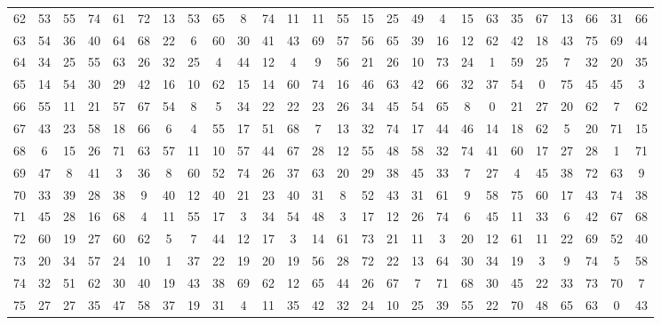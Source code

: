 \begin{table}
\begin{tabular}{c c c c c c c c c c c c c c c c c c c c c c c c c c }
62 & 53 & 55 & 74 & 61 & 72 & 13 & 53 & 65 & 8 & 74 & 11 & 11 & 55 & 15 & 25 & 49 & 4 & 15 & 63 & 35 & 67 & 13 & 66 & 31 & 66 \\
63 & 54 & 36 & 40 & 64 & 68 & 22 & 6 & 60 & 30 & 41 & 43 & 69 & 57 & 56 & 65 & 39 & 16 & 12 & 62 & 42 & 18 & 43 & 75 & 69 & 44 \\
64 & 34 & 25 & 55 & 63 & 26 & 32 & 25 & 4 & 44 & 12 & 4 & 9 & 56 & 21 & 26 & 10 & 73 & 24 & 1 & 59 & 25 & 7 & 32 & 20 & 35 \\
65 & 14 & 54 & 30 & 29 & 42 & 16 & 10 & 62 & 15 & 14 & 60 & 74 & 16 & 46 & 63 & 42 & 66 & 32 & 37 & 54 & 0 & 75 & 45 & 45 & 3 \\
66 & 55 & 11 & 21 & 57 & 67 & 54 & 8 & 5 & 34 & 22 & 22 & 23 & 26 & 34 & 45 & 54 & 65 & 8 & 0 & 21 & 27 & 20 & 62 & 7 & 62 \\
67 & 43 & 23 & 58 & 18 & 66 & 6 & 4 & 55 & 17 & 51 & 68 & 7 & 13 & 32 & 74 & 17 & 44 & 46 & 14 & 18 & 62 & 5 & 20 & 71 & 15 \\
68 & 6 & 15 & 26 & 71 & 63 & 57 & 11 & 10 & 57 & 44 & 67 & 28 & 12 & 55 & 48 & 58 & 32 & 74 & 41 & 60 & 17 & 27 & 28 & 1 & 71 \\
69 & 47 & 8 & 41 & 3 & 36 & 8 & 60 & 52 & 74 & 26 & 37 & 63 & 20 & 29 & 38 & 45 & 33 & 7 & 27 & 4 & 45 & 38 & 72 & 63 & 9 \\
70 & 33 & 39 & 28 & 38 & 9 & 40 & 12 & 40 & 21 & 23 & 40 & 31 & 8 & 52 & 43 & 31 & 61 & 9 & 58 & 75 & 60 & 17 & 43 & 74 & 38 \\
71 & 45 & 28 & 16 & 68 & 4 & 11 & 55 & 17 & 3 & 34 & 54 & 48 & 3 & 17 & 12 & 26 & 74 & 6 & 45 & 11 & 33 & 6 & 42 & 67 & 68 \\
72 & 60 & 19 & 27 & 60 & 62 & 5 & 7 & 44 & 12 & 17 & 3 & 14 & 61 & 73 & 21 & 11 & 3 & 20 & 12 & 61 & 11 & 22 & 69 & 52 & 40 \\
73 & 20 & 34 & 57 & 24 & 10 & 1 & 37 & 22 & 19 & 20 & 19 & 56 & 28 & 72 & 22 & 13 & 64 & 30 & 34 & 19 & 3 & 9 & 74 & 5 & 58 \\
74 & 32 & 51 & 62 & 30 & 40 & 19 & 43 & 38 & 69 & 62 & 12 & 65 & 44 & 26 & 67 & 7 & 71 & 68 & 30 & 45 & 22 & 33 & 73 & 70 & 7 \\
75 & 27 & 27 & 35 & 47 & 58 & 37 & 19 & 31 & 4 & 11 & 35 & 42 & 32 & 24 & 10 & 25 & 39 & 55 & 22 & 70 & 48 & 65 & 63 & 0 & 43 \\
\hline
\end{tabular}
\end{table}